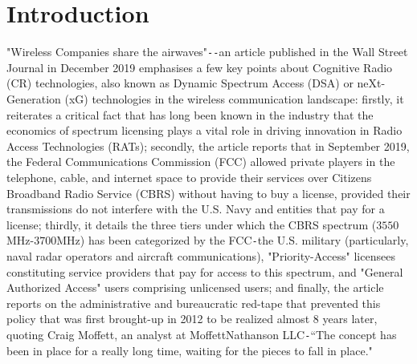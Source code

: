 \documentclass[12pt, draftcls, onecolumn]{IEEEtran}
\begin{document}
\section{Introduction}\label{O}
"Wireless Companies share the airwaves"\texttt{-{}-}an article \cite{WSJ:CBRS} published in the Wall Street Journal in December 2019 emphasises a few key points about Cognitive Radio (CR) technologies, also known as Dynamic Spectrum Access (DSA) or neXt-Generation (xG) technologies in the wireless communication landscape: firstly, it reiterates a critical fact that has long been known in the industry that the economics of spectrum licensing plays a vital role in driving innovation in Radio Access Technologies (RATs); secondly, the article reports that in September 2019, the Federal Communications Commission (FCC) allowed private players in the telephone, cable, and internet space to provide their services over Citizens Broadband Radio Service (CBRS) without having to buy a license, provided their transmissions do not interfere with the U.S. Navy and entities that pay for a license; thirdly, it details the three tiers under which the CBRS spectrum ($3550$MHz-$3700$MHz) has been categorized by the FCC\texttt{-}the U.S. military (particularly, naval radar operators and aircraft communications), "Priority-Access" licensees constituting service providers that pay for access to this spectrum, and "General Authorized Access" users comprising unlicensed users; and finally, the article reports on the administrative and bureaucratic red-tape that prevented this policy that was first brought-up in 2012 to be realized almost 8 years later, quoting Craig Moffett, an analyst at MoffettNathanson LLC\texttt{-}``The concept has been in place for a really long time, waiting for the pieces to fall in place."
\end{document}
